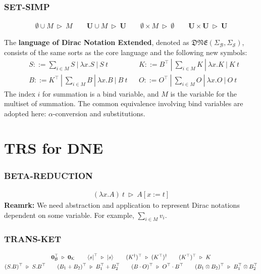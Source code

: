 \documentclass[manuscript, review, timestamp]{acmart}
\newcommand*{\reduce}{\ \triangleright\ }
\begin{document}
\subsubsection*{\textsf{SET-SIMP}}
\begin{gather*}
  \emptyset \cup M \reduce M
  \qquad
  \mathbf{U} \cup M \reduce \mathbf{U}
  \qquad
  \emptyset \times M \reduce \emptyset
  \qquad
  \mathbf{U} \times \mathbf{U} \reduce \mathbf{U}
\end{gather*}

\begin{definition}[DNE]
    The \textbf{language of Dirac Notation Extended}, denoted as $\mathfrak{DNE}(\Sigma_\mathcal{B}, \Sigma_\mathcal{S})$, consists of the same sorts as the core language and the following new symbols:
    \begin{align*}
        & S ::= \sum_{i \in M} S\ |\ \lambda x.S\ |\ S\ t && K ::= B^\top\ |\ \sum_{i \in M} K\ |\ \lambda x.K\ |\ K\ t \\
        & B ::= K^\top\ |\ \sum_{i \in M} B\ |\ \lambda x.B\ |\ B\ t && O ::= O^\top\ |\ \sum_{i \in M} O\ |\ \lambda x.O\ |\ O\ t
    \end{align*}
    The index $i$ for summation is a bind variable, and $M$ is the variable for the multiset of summation. The common equivalence involving bind variables are adopted here: $\alpha$-conversion and substitutions.
\end{definition}

\section{TRS for DNE}

\subsubsection*{\textsf{BETA-REDUCTION}}
\begin{gather*}
  (\lambda x.A)\ t \reduce A[x:=t]
\end{gather*}
\textbf{Reamrk:} We need abstraction and application to represent Dirac notations dependent on some variable. For example, $\sum_{i \in M} v_i$.

\subsubsection*{\textsf{TRANS-KET}}
\begin{gather*}
  \mathbf{0}_\mathcal{B}^\top \reduce \mathbf{0}_\mathcal{K}
  \qquad
  \bra{s}^\top \reduce \ket{s}
  \qquad
  (K^\dagger)^\top \reduce (K^\top)^\dagger
  \qquad
  (K^\top)^\top \reduce K \\
  (S . B)^\top \reduce S . B^\top
  \qquad
  (B_1 + B_2)^\top \reduce B_1^\top + B_2^\top
  \qquad
  (B \cdot O)^\top \reduce O^\top \cdot B^\top
  \qquad
  (B_1 \otimes B_2)^\top \reduce B_1^\top \otimes B_2^\top
\end{gather*}
\end{document}
